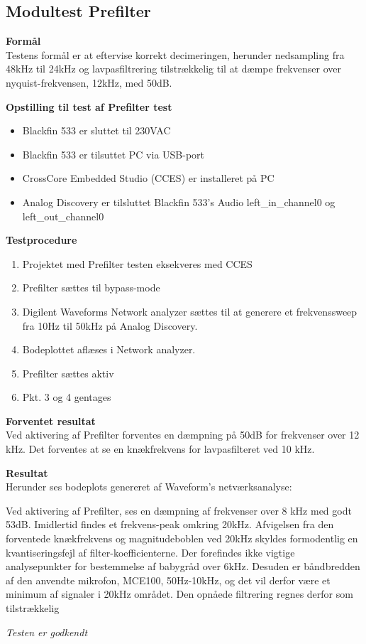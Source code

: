 \subsection{Modultest Prefilter}

\textbf{Formål} \\
Testens formål er at eftervise korrekt decimeringen, herunder nedsampling fra 48kHz til 24kHz og lavpasfiltrering tilstrækkelig til at dæmpe frekvenser over nyquist-frekvensen, 12kHz, med 50dB. 

\textbf{Opstilling til test af Prefilter test}

\begin{itemize}
	\item Blackfin 533 er sluttet til 230VAC
	\item Blackfin 533 er tilsuttet PC via USB-port
	\item CrossCore Embedded Studio (CCES) er installeret på PC
	\item Analog Discovery er tilsluttet Blackfin 533's Audio left\_in\_channel0 og left\_out\_channel0
\end{itemize}

\textbf{Testprocedure}
\begin{enumerate}
	\item Projektet med Prefilter testen eksekveres med CCES 
	\item Prefilter sættes til bypass-mode
	\item Digilent Waveforms Network analyzer sættes til at generere et frekvenssweep fra 10Hz til 50kHz på Analog Discovery. 
	\item Bodeplottet aflæses i Network analyzer. 
	\item Prefilter sættes aktiv
	\item Pkt. 3 og 4 gentages
\end{enumerate}

\textbf{Forventet resultat} \\
Ved aktivering af Prefilter forventes en dæmpning på 50dB for frekvenser over 12 kHz. Det forventes at se en knækfrekvens for lavpasfilteret ved 10 kHz.

\textbf{Resultat} \\
Herunder ses bodeplots genereret af Waveform's netværksanalyse:

Ved aktivering af Prefilter, ses en dæmpning af frekvenser over 8 kHz med godt 53dB. Imidlertid findes et frekvens-peak omkring 20kHz. Afvigelsen fra den forventede knækfrekvens og magnitudeboblen ved 20kHz skyldes formodentlig en kvantiseringsfejl af filter-koefficienterne. Der forefindes ikke vigtige analysepunkter for bestemmelse af babygråd over 6kHz. Desuden er båndbredden  af den anvendte mikrofon, MCE100, 50Hz-10kHz, og det vil derfor være et minimum af signaler i 20kHz området. Den opnåede filtrering regnes derfor som tilstrækkelig

\textit{Testen er godkendt}





